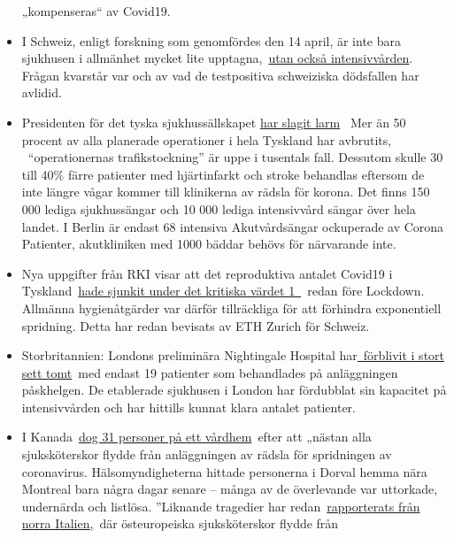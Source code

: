 \begin{itemize}
  „kompenseras`` av Covid19.
\item
  I Schweiz, enligt forskning som genomfördes den 14 april, är inte bara
  sjukhusen i allmänhet mycket lite
  upptagna,~\href{https://swprs.files.wordpress.com/2020/03/42ad8-intensivbettenbelegung2bschweiz2b-2b14-4-20202bpdf.png}{utan
  också intensivvården}. Frågan kvarstår var och av vad de testpositiva
  schweiziska dödsfallen har avlidid.
\item
  Presidenten för det tyska sjukhussällskapet
  \href{https://www.bz-berlin.de/deutschland/kliniken-verband-schlaegt-alarm-wegen-corona-regeln}{har
  slagit larm}~ Mer än 50 procent av alla planerade operationer i hela
  Tyskland har avbrutits, ~``operationernas trafikstockning'' är uppe i
  tusentals fall. Dessutom skulle 30 till 40\% färre patienter med
  hjärtinfarkt och stroke behandlas eftersom de inte längre vågar kommer
  till klinikerna av rädsla för korona. Det finns 150 000 lediga
  sjukhussängar och 10 000 lediga intensivvård sängar över hela landet.
  I Berlin är endast 68 intensiva Akutvårdsängar ockuperade av Corona
  Patienter, akutkliniken med 1000 bäddar behövs för närvarande inte.
\item
  Nya uppgifter från RKI visar att det reproduktiva antalet Covid19 i
  Tyskland~\href{https://www.rki.de/DE/Content/Infekt/EpidBull/Archiv/2020/Ausgaben/17_20_SARS-CoV2_vorab.pdf}{hade
  sjunkit under det kritiska värdet 1~}~redan före Lockdown. Allmänna
  hygienåtgärder var därför tillräckliga för att förhindra exponentiell
  spridning. Detta har redan bevisats av ETH Zurich för Schweiz.
\item
  Storbritannien: Londons preliminära Nightingale Hospital
  har\href{https://www.hsj.co.uk/service-design/exclusive-nightingale-largely-empty-as-icus-handle-surge/7027398.article}{~förblivit
  i stort sett tomt}~med endast 19 patienter som behandlades på
  anläggningen påskhelgen. De etablerade sjukhusen i London har
  fördubblat sin kapacitet på intensivvården och har hittills kunnat
  klara antalet patienter.
\item
  I Kanada~\href{https://orf.at/stories/3162365/}{dog 31 personer på ett
  vårdhem}~efter att „nästan alla sjuksköterskor flydde från
  anläggningen av rädsla för spridningen av coronavirus.
  Hälsomyndigheterna hittade personerna i Dorval hemma nära Montreal
  bara några dagar senare -- många av de överlevande var uttorkade,
  undernärda och listlösa. ''Liknande tragedier har
  redan~\href{https://swprs.org/covid19-bericht-aus-italien/}{rapporterats
  från norra Italien,}~där östeuropeiska sjuksköterskor flydde från

\end{itemize}

